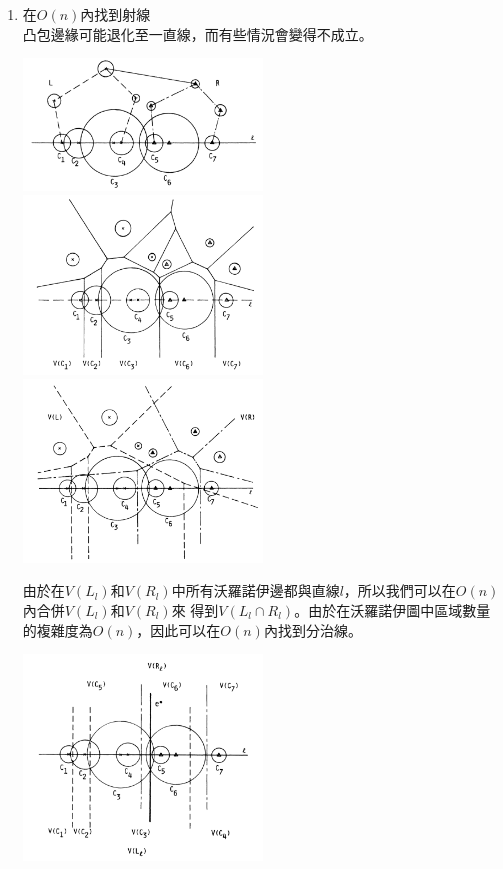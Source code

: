 \documentclass[15pt]{extarticle}
\begin{document}
\begin{enumerate}
    \item 在$O(n)$內找到射線 \\
    凸包邊緣可能退化至一直線，而有些情況會變得不成立。
    \begin{center}
        \includegraphics[width=0.5\textwidth]{./img/fig5.png}
        \includegraphics[width=0.5\textwidth]{./img/fig6.png}
        \includegraphics[width=0.5\textwidth]{./img/fig7.png}
    \end{center}
    由於在$V(L_l)$和$V(R_l)$中所有沃羅諾伊邊都與直線$l$，所以我們可以在$O(n)$內合併$V(L_l)$和$V(R_l)$來
    得到$V(L_l\cap R_l)$。由於在沃羅諾伊圖中區域數量的複雜度為$O(n)$，因此可以在$O(n)$內找到分治線。
    \begin{center}
        \includegraphics[width=0.5\textwidth]{./img/fig8.png}
    \end{center}
\end{enumerate}
\end{document}
